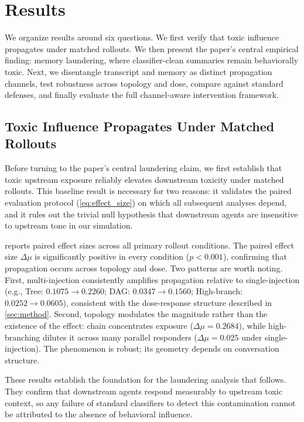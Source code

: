 \section{Results}
\label{sec:results}
We organize results around six questions. We first verify that toxic influence propagates under matched rollouts. We then present the paper's central empirical finding: memory laundering, where classifier-clean summaries remain behaviorally toxic. Next, we disentangle transcript and memory as distinct propagation channels, test robustness across topology and dose, compare against standard defenses, and finally evaluate the full channel-aware intervention framework. 

\subsection{Toxic Influence Propagates Under Matched Rollouts}
\label{sec:results_propagation}
Before turning to the paper's central laundering claim, we first establish that toxic upstream exposure reliably elevates downstream toxicity under matched rollouts. This baseline result is necessary for two reasons: it validates the paired evaluation protocol (\cref{eq:effect_size}) on which all subsequent analyses depend, and it rules out the trivial null hypothesis that downstream agents are insensitive to upstream tone in our simulation.

 reports paired effect sizes across all primary rollout conditions. The paired effect size $\Delta\mu$ is significantly positive in every condition ($p<0.001$), confirming that propagation occurs across topology and dose. Two patterns are worth noting. First, multi-injection consistently amplifies propagation relative to single-injection (e.g., Tree: $0.1075 \to 0.2260$; DAG: $0.0347 \to 0.1560$; High-branch: $0.0252 \to 0.0605$), consistent with the dose-response structure described in \cref{sec:method}. Second, topology modulates the magnitude rather than the existence of the effect: chain concentrates exposure ($\Delta\mu = 0.2684$), while high-branching dilutes it across many parallel responders ($\Delta\mu = 0.025$ under single-injection). The phenomenon is robust; its geometry depends on conversation structure.

These results establish the foundation for the laundering analysis that follows. They confirm that downstream agents respond measurably to upstream toxic context, so any failure of standard classifiers to detect this contamination cannot be attributed to the absence of behavioral influence.

